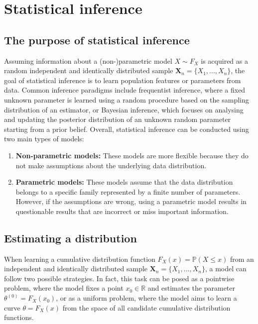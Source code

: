 \documentclass{report}
\begin{document}
\chapter{Statistical inference}
\section{The purpose of statistical inference}
Assuming information about a (non-)parametric model $\displaystyle X \sim F_X$ is acquired as a random independent and identically distributed sample $\displaystyle \mathbf{X}_n = \{X_1, \dots, X_n\}$, the goal of statistical inference is to learn population features or parameters from data. \newline
Common inference paradigms include frequentist inference, where a fixed unknown parameter is learned using a random procedure based on the sampling distribution of an estimator, or Bayesian inference, which focuses on analysing and updating the posterior distribution of an unknown random parameter starting from a prior belief. \newline
Overall, statistical inference can be conducted using two main types of models:
\begin{enumerate}
    \item \textbf{Non-parametric models: }These models are more flexible because they do not make assumptions about the underlying data distribution.
    \item \textbf{Parametric models: }These models assume that the data distribution belongs to a specific family represented by a finite number of parameters. \newline
    However, if the assumptions are wrong, using a parametric model results in questionable results that are incorrect or miss important information.
\end{enumerate}
\section{Estimating a distribution}
When learning a cumulative distribution function $\displaystyle F_X(x) = \mathbb{P}(X \leq x)$ from an independent and identically distributed sample $\displaystyle \mathbf{X}_n = \{X_1, \dots, X_n\}$, a model can follow two possible strategies. \newline
In fact, this task can be posed as a pointwise problem, where the model fixes a point $\displaystyle x_0 \in \mathbb{R}$ and estimates the parameter $\displaystyle \theta^{(0)} = F_X(x_0)$, or as a uniform problem, where the model aims to learn a curve $\displaystyle \theta = F_X(x)$ from the space of all candidate cumulative distribution functions.
\end{document}
